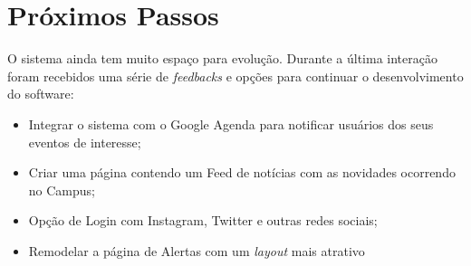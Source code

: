 \chapter{Próximos Passos}
\label{cap:proximospassos}
\par O sistema ainda tem muito espaço para evolução. Durante a última interação foram recebidos uma série de \emph{feedbacks} e opções para continuar o desenvolvimento do software:
\begin{itemize}
\item{Integrar o sistema com o Google Agenda para notificar usuários dos seus eventos de interesse;}
\item{Criar uma página contendo um Feed de notícias com as novidades ocorrendo no Campus;}
\item{Opção de Login com Instagram, Twitter e outras redes sociais;}
\item{Remodelar a página de Alertas com um \emph{layout} mais atrativo}
\end{itemize}
